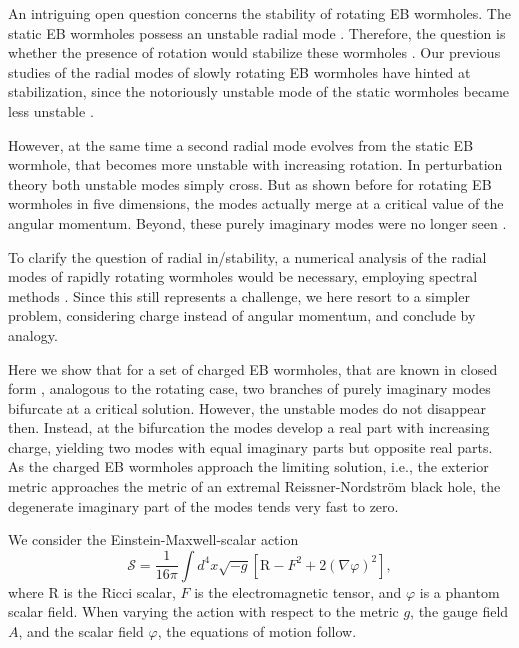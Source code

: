 \documentclass[floats,floatfix,showpacs,amssymb,prd,superscriptaddress,nofootinbib,nolongbibliography,reprint]{revtex4-2}
\newcommand\prlsec[1]{\vspace{2mm}\noindent {\textbf{  \textit{#1}}}}
\begin{document}
An intriguing open question concerns the stability of rotating EB wormholes.
The static EB wormholes possess an unstable radial mode \cite{Shinkai:2002gv,Gonzalez:2008wd,Gonzalez:2008xk,Cremona:2018wkj}.
Therefore, the question is whether the presence of rotation would stabilize these wormholes \cite{Matos:2010pcd}.
Our previous studies of the radial modes of slowly rotating EB wormholes have hinted at stabilization, since the notoriously unstable mode of the static wormholes became less unstable \cite{Azad:2023iju,Azad:2024axu}.

However, at the same time a second radial mode evolves from the static EB wormhole, that becomes more unstable with increasing rotation.
In perturbation theory both unstable modes simply cross.
But as shown before for rotating EB wormholes in five dimensions, the modes actually merge at a critical value of the angular momentum.
Beyond, these purely imaginary modes were no longer seen \cite{Dzhunushaliev:2013jja}.

To clarify the question of radial in/stability, a numerical analysis of the radial modes of rapidly rotating wormholes would be necessary, employing spectral methods \cite{Blazquez-Salcedo:2023hwg,Khoo:2024yeh,Blazquez-Salcedo:2024oek, 
Blazquez-Salcedo:2024dur}.
Since this still represents a challenge, we here resort to a simpler problem, considering charge instead of angular momentum, and conclude by analogy.

Here we show that for a set of charged EB wormholes, that are known in closed form \cite{Gonzalez:2009hn}, analogous to the rotating case, two branches of purely imaginary modes bifurcate at a critical solution.
However, the unstable modes do not disappear then.
Instead, at the bifurcation the modes develop a real part with increasing charge, yielding two modes with equal imaginary parts but opposite real parts.
As the charged EB wormholes approach the limiting solution, i.e., the exterior metric approaches the metric of an extremal Reissner-Nordstr\"om black hole, the degenerate imaginary part of the modes tends very fast
to zero.



\prlsec{Theoretical framework.}
We consider the Einstein-Maxwell-scalar action
\begin{equation}
    \mathcal{S}=\frac{1}{16\pi}\int d^4x\sqrt{-g}\left[ \mathrm{R}-F^2+2(\nabla\varphi)^2\right],
\end{equation}
where $\mathrm{R}$ is the Ricci scalar, $F$ is the electromagnetic tensor, and $\varphi$ is a phantom scalar field. 
When varying the action with respect to the metric $g$, the gauge field $A$, and the scalar field $\varphi$, the equations of motion follow.
\end{document}
